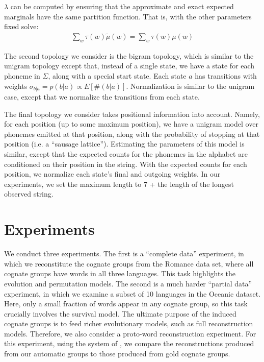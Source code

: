 \documentclass[11pt,a4paper]{article}
\begin{document}
$\lambda$ can be computed by ensuring that the
approximate and exact expected marginals have the same partition
function. That is, with the other parameters fixed solve:
\begin{equation*}
  \begin{split}
    \sum_w \tau(w) \tilde\mu(w) = \sum_w \tau(w) \mu(w)
  \end{split}
\end{equation*}

The second topology we consider is the bigram topology, which is
similar to the unigram topology except that, instead of a single
state, we have a state for each phoneme in $\Sigma$, along with
a special start state. Each state $a$ has transitions with weights
$\sigma_{b|a}= p(b|a) \propto E[\#(b|a)]$. Normalization is similar
to the unigram case, except that we normalize the transitions from
each state.

The final topology we consider takes positional information into
account. Namely, for each position (up to some maximum position),
we have a unigram model over phonemes emitted at that position,
along with the probability of stopping at that position (i.e. a
``sausage lattice''). Estimating the parameters of this model is
similar, except that the expected counts for the phonemes in the
alphabet are conditioned on their position in the string. With the
expected counts for each position, we normalize each state's final
and outgoing weights. In our experiments, we set the maximum length
to 7 + the length of the longest observed string.

\section{Experiments}

We conduct three experiments. The first is a ``complete data''
experiment, in which we reconstitute the cognate groups from the
Romance data set, where all cognate groups have words in all three
languages.  This task highlights the evolution and permutation
models.  The second is a much harder ``partial data'' experiment,
in which we examine a subset of 10 languages in the Oceanic dataset.
Here, only a small fraction of words appear in any cognate group,
so this task crucially involves the survival model.  The ultimate
purpose of the induced cognate groups is to feed richer evolutionary
models, such as full reconstruction models.  Therefore, we also
consider a proto-word reconstruction experiment.  For this experiment,
using the system of , we compare the
reconstructions produced from our automatic groups to those produced
from gold cognate groups.
\end{document}
